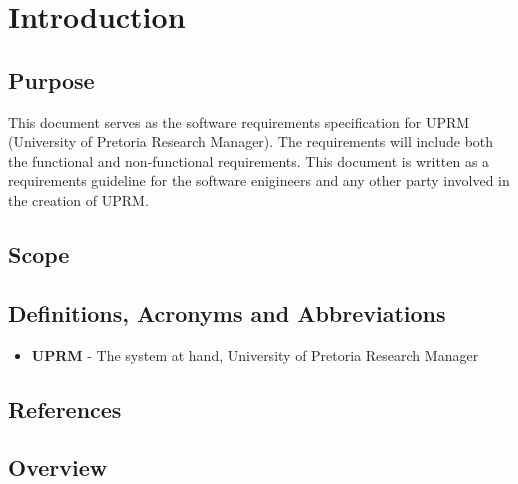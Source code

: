 \section{Introduction}

	\subsection{Purpose}
		This document serves as the software requirements specification for UPRM (University of Pretoria Research Manager). 
		The requirements will include both the functional and non-functional requirements. 
		This document is written as a requirements guideline for the software enigineers and any other party involved in the creation of UPRM.
	\subsection{Scope}
	\subsection{Definitions, Acronyms and Abbreviations}
		\begin{itemize}
			\item{\textbf{UPRM}} - The system at hand, University of Pretoria Research Manager
		\end{itemize}
	\subsection{References}
		

	\subsection{Overview}
